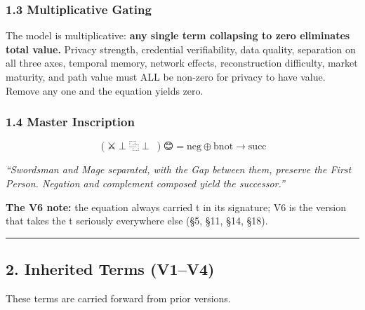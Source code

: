 \documentclass[
  11pt,
]{article}
\begin{document}
\subsubsection{1.3 Multiplicative Gating}\label{multiplicative-gating}

The model is multiplicative: \textbf{any single term collapsing to zero
eliminates total value.} Privacy strength, credential verifiability,
data quality, separation on all three axes, temporal memory, network
effects, reconstruction difficulty, market maturity, and path value must
ALL be non-zero for privacy to have value. Remove any one and the
equation yields zero.

\subsubsection{1.4 Master Inscription}\label{master-inscription}

\[(\text{⚔️} \perp \text{⿻} \perp \text{🧙})\text{😊} = \text{neg} \oplus \text{bnot} \to \text{succ}\]

\emph{``Swordsman and Mage separated, with the Gap between them,
preserve the First Person. Negation and complement composed yield the
successor.''}

\textbf{The V6 note:} the equation always carried t in its signature; V6
is the version that takes the t seriously everywhere else (§5, §11, §14,
§18).

\begin{center}\rule{0.5\linewidth}{0.5pt}\end{center}

\subsection{2. Inherited Terms (V1--V4)}\label{inherited-terms-v1v4}

These terms are carried forward from prior versions.
\end{document}
